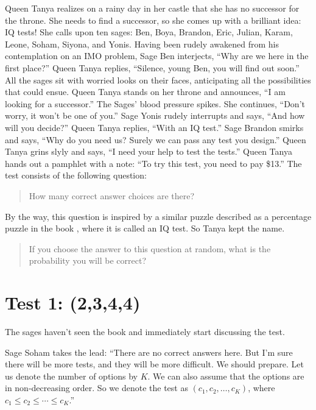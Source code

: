 \documentclass[12pt,reqno]{article}
\theoremstyle{plain}
\theoremstyle{definition}
\theoremstyle{remark}
\begin{document}
Queen Tanya realizes on a rainy day in her castle that she has no successor for the throne. She needs to find a successor, so she comes up with a brilliant idea: IQ tests! She calls upon ten sages: Ben, Boya, Brandon, Eric, Julian, Karam, Leone, Soham, Siyona, and Yonis. Having been rudely awakened from his contemplation on an IMO problem, Sage Ben interjects, ``Why are we here in the first place?'' Queen Tanya replies, ``Silence, young Ben, you will find out soon.'' All the sages sit with worried looks on their faces, anticipating all the possibilities that could ensue. Queen Tanya stands on her throne and announces, ``I am looking for a successor.'' The Sages' blood pressure spikes. She continues, ``Don't worry, it won't be one of you.'' Sage Yonis rudely interrupts and says, ``And how will you decide?'' Queen Tanya replies, ``With an IQ test.'' Sage Brandon smirks and says, ``Why do you need us? Surely we can pass any test you design.'' Queen Tanya grins slyly and says, ``I need your help to test the tests.'' Queen Tanya hands out a pamphlet with a note: ``To try this test, you need to pay \$13.'' The test consists of the following question:

\begin{quote}
    How many correct answer choices are there?
\begin{center}
\end{center}
\end{quote}

By the way, this question is inspired by a similar puzzle described as a percentage puzzle in the book \cite{DKS}, where it is called an IQ test. So Tanya kept the name.

\begin{quote}
If you choose the answer to this question at random, what is the probability you will be correct?
\begin{center}
\end{center}
\end{quote}

\section{Test 1: (2,3,4,4)}

The sages haven't seen the book and immediately start discussing the test. 

Sage Soham takes the lead: ``There are no correct answers here. But I'm sure there will be more tests, and they will be more difficult. We should prepare. Let us denote the number of options by $K$. We can also assume that the options are in non-decreasing order. So we denote the test as $(c_1,c_2,\dots, c_K)$, where $c_1 \le c_2 \le \cdots \le c_K$.''
\end{document}
